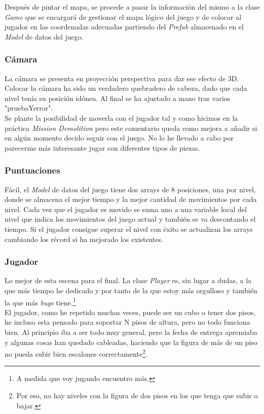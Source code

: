 \documentclass{article}
\begin{document}
Después de pintar el mapa, se procede a pasar la información del mismo a la clase \emph{Game} que se encargará de gestionar el mapa lógico del juego y de colocar al jugador en las coordenadas adecuadas partiendo del \emph{Prefab} almacenado en el \emph{Model} de datos del juego. 

\subsubsection{Cámara}
La cámara se presenta en proyección perspectiva para dar ese efecto de 3D. Colocar la cámara ha sido un verdadero quebradero de cabeza, dado que cada nivel tenía su posición idónea. Al final se ha ajustado a mano tras varios "pruebaYerror".\\

Se plante la posibilidad de moverla con el jugador tal y como hicimos en la práctica \emph{Mission Demolition} pero este comentario queda como mejora a añadir si en algún momento decido seguir con el juego. No lo he llevado a cabo por parecerme más interesante jugar con diferentes tipos de piezas.

\subsubsection{Puntuaciones}
\label{subsec:puntos}
Fácil, el \emph{Model} de datos del juego tiene dos arrays de 8 posiciones, una por nivel, donde se almacena el mejor tiempo y la mejor cantidad de movimientos por cada nivel. Cada vez que el jugador es movido se suma uno a una variable local del nivel que indica los movimientos del juego actual y también se va descontando el tiempo. Si el jugador consigue superar el nivel con éxito se actualizan los arrays cambiando los récord si ha mejorado los existentes.

\subsubsection{Jugador}
Lo mejor de esta escena para el final. La clase \emph{Player} es, sin lugar a dudas, a la que más tiempo he dedicado y por tanto de la que estoy más orgulloso y también la que más \emph{bugs} tiene.\footnote{A medida que voy jugando encuentro más.}\\

El jugador, como he repetido muchas veces, puede ser un cubo o tener dos pisos, he incluso esta pensado para soportar N pisos de altura, pero no todo funciona bien. Al principio iba a ser todo muy general, pero la fecha de entrega apremiaba y algunas cosas han quedado cableadas, haciendo que la figura de más de un piso no pueda subir bien escalones correctamente\footnote{Por eso, no hay niveles con la figura de dos pisos en los que tenga que subir o bajar.}.\\
\end{document}

